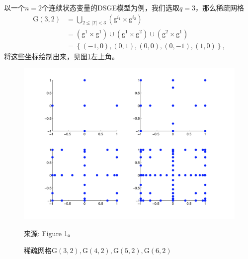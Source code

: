 以一个$n=2$个连续状态变量的DSGE模型为例，我们选取$q=3$，那么稀疏网格
\begin{equation}
  \label{eq:pj-sparsity-steps-sparse-grid-32}
  \begin{split}
    \mathrm{G} \left( 3, 2 \right)
    & = \bigcup_{2 \le \left| \Upsilon \right| < 3} \left( \mathrm{g}^{i_1} \times \mathrm{g}^{i_2} \right) \\
    & = \left( \mathrm{g}^{1} \times \mathrm{g}^{1} \right)
    \cup
    \left( \mathrm{g}^{1} \times \mathrm{g}^{2} \right)
    \cup
    \left( \mathrm{g}^{2} \times \mathrm{g}^{1} \right) \\
    & = \left\{ (-1,0), (0,1), (0,0), (0,-1), (1,0) \right\},
  \end{split}
\end{equation}
将这些坐标绘制出来，见图\ref{fig:pj-sparse-grid-example}左上角。

\begin{figure}[htbp]
   \caption[稀疏网格]{稀疏网格$\mathrm{G}(3,2),\mathrm{G}(4,2),\mathrm{G}(5,2),\mathrm{G}(6,2)$}
  \centering
  \includegraphics[width=12cm]{./Figures/20180325-sparse-grid-example}
  \label{fig:pj-sparse-grid-example}

  \small{来源: \cite{Krueger:2004gh} Figure 1。}
\end{figure}

